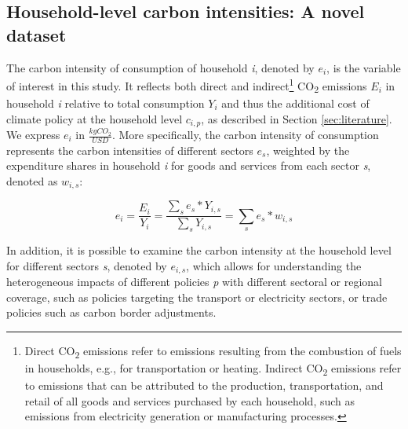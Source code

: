 \documentclass[12pt, a4paper]{article}
\begin{document}
\subsection{Household-level carbon intensities: A novel dataset} \label{sec:data}

The carbon intensity of consumption of household \textit{i}, denoted by $e_{i}$, is the variable of interest in this study. It reflects both direct and indirect\footnote{Direct CO\textsubscript{2} emissions refer to emissions resulting from the combustion of fuels in households, e.g., for transportation or heating. Indirect CO\textsubscript{2} emissions refer to emissions that can be attributed to the production, transportation, and retail of all goods and services purchased by each household, such as emissions from electricity generation or manufacturing processes.} CO\textsubscript{2} emissions $E_{i}$ in household \textit{i} relative to total consumption $Y_{i}$ and thus the additional cost of climate policy at the household level $c_{i,p}$, as described in Section \ref{sec:literature}. We express $e_{i}$ in $\frac{kgCO_{2}}{USD}$. More specifically, the carbon intensity of consumption represents the carbon intensities of different sectors $e_{s}$, weighted by the expenditure shares in household \textit{i} for goods and services from each sector \textit{s}, denoted as $w_{i,s}$:


\begin{equation} \label{eq:ei}
e_{i} = \frac{E_{i}}{Y_{i}} = \frac{\sum_{s} e_{s}*Y_{i,s}}{\sum_{s} Y_{i,s}} = \sum_{s} e_{s}*w_{i,s}
\end{equation}


In addition, it is possible to examine the carbon intensity at the household level for different sectors \textit{s}, denoted by $e_{i,s}$, which allows for understanding the heterogeneous impacts of different policies \textit{p} with different sectoral or regional coverage, such as policies targeting the transport or electricity sectors, or trade policies such as carbon border adjustments.

\end{document}
